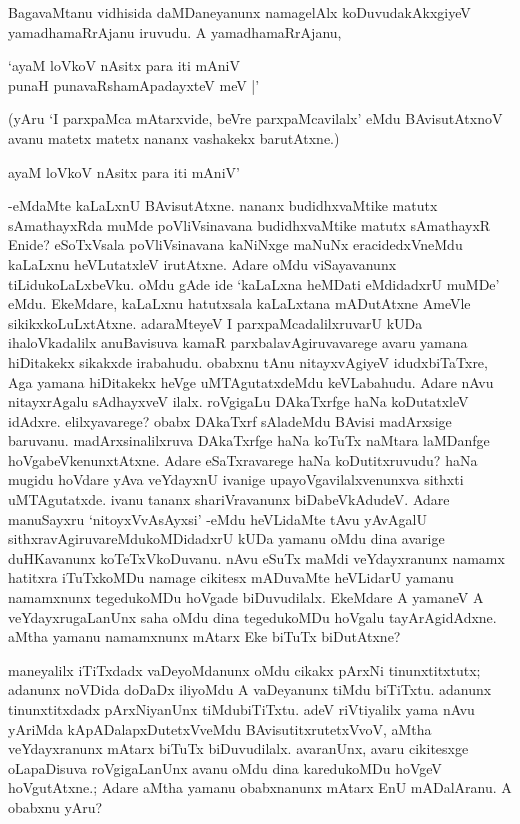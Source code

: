 BagavaMtanu vidhisida daMDaneyanunx namagelAlx koDuvudakAkxgiyeV yamadhamaRrAjanu iruvudu. A yamadhamaRrAjanu,

\begin{shloka}
`ayaM loVkoV nAsitx para iti mAniV\\
punaH punavaRshamApadayxteV meV |'
\end{shloka}

(yAru `I parxpaMca mAtarxvide, beVre parxpaMcavilalx' eMdu BAvisutAtxnoV avanu matetx matetx nananx vashakekx barutAtxne.)

\begin{shloka}
ayaM loVkoV nAsitx para iti mAniV'
\end{shloka}

-eMdaMte kaLaLxnU BAvisutAtxne. nananx budidhxvaMtike matutx sAmathayxRda muMde poVliVsinavana budidhxvaMtike matutx sAmathayxR Enide? eSoTxVsala poVliVsinavana kaNiNxge maNuNx eracidedxVneMdu kaLaLxnu heVLutatxleV irutAtxne. Adare oMdu viSayavanunx tiLidukoLaLxbeVku. oMdu gAde ide `kaLaLxna heMDati eMdidadxrU muMDe' eMdu. EkeMdare, kaLaLxnu hatutxsala kaLaLxtana mADutAtxne AmeVle sikikxkoLuLxtAtxne. adaraMteyeV I parxpaMcadalilxruvarU kUDa ihaloVkadalilx anuBavisuva kamaR parxbalavAgiruvavarege avaru yamana hiDitakekx sikakxde irabahudu. obabxnu tAnu nitayxvAgiyeV idudxbiTaTxre, Aga yamana hiDitakekx heVge uMTAgutatxdeMdu keVLabahudu. Adare nAvu nitayxrAgalu sAdhayxveV ilalx. roVgigaLu DAkaTxrfge haNa koDutatxleV idAdxre. elilxyavarege? obabx DAkaTxrf sAladeMdu BAvisi madArxsige baruvanu. madArxsinalilxruva DAkaTxrfge haNa koTuTx naMtara laMDanfge hoVgabeVkenunxtAtxne. Adare eSaTxravarege haNa koDutitxruvudu? haNa mugidu hoVdare yAva veYdayxnU ivanige upayoVgavilalxvenunxva sithxti uMTAgutatxde. ivanu tananx shariVravanunx biDabeVkAdudeV. Adare manuSayxru `nitoyxVvAsAyxsi' -eMdu heVLidaMte tAvu yAvAgalU sithxravAgiruvareMdukoMDidadxrU kUDa yamanu oMdu dina avarige duHKavanunx koTeTxVkoDuvanu. nAvu eSuTx maMdi veYdayxranunx namamx hatitxra iTuTxkoMDu namage cikitesx mADuvaMte heVLidarU yamanu namamxnunx tegedukoMDu hoVgade biDuvudilalx. EkeMdare A yamaneV A veYdayxrugaLanUnx saha oMdu dina tegedukoMDu hoVgalu tayArAgidAdxne. aMtha yamanu namamxnunx mAtarx Eke biTuTx biDutAtxne?

maneyalilx iTiTxdadx vaDeyoMdanunx oMdu cikakx pArxNi tinunxtitxtutx; adanunx noVDida doDaDx iliyoMdu A vaDeyanunx tiMdu biTiTxtu. adanunx tinunxtitxdadx pArxNiyanUnx tiMdubiTiTxtu. adeV riVtiyalilx yama nAvu yAriMda kApADalapxDutetxVveMdu BAvisutitxrutetxVvoV, aMtha veYdayxranunx mAtarx biTuTx biDuvudilalx. avaranUnx, avaru cikitesxge oLapaDisuva roVgigaLanUnx avanu oMdu dina karedukoMDu hoVgeV hoVgutAtxne.; Adare aMtha yamanu obabxnanunx mAtarx EnU mADalAranu. A obabxnu yAru?

